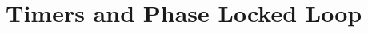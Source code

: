 \documentclass[../course]{subfiles}
\begin{document}
\chapter{Timers and Phase Locked Loop }


\end{document}
